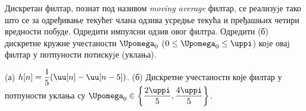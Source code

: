 \PID 
Дискретан филтар, познат под називом \textit{moving average} филтар, се реализуjе тако што се за одређивање текућег
члана одзива усредње текућа и пређашњих четири вредности побуде. Одредити импулсни одзив овог филтра.
Одредити (б) дискретне кружне учестаности $\Upomega_0$ ($0 \leq \Upomega_0 \leq \uppi$) 
коjе оваj филтар у потпуности потискуjе (уклања).

\REZULTAT
(а) $h[n] = \dfrac{1}{5}( \uu[n] - \uu[n-5] )$. (б) Дискретне учестаности које филтар у потпуности уклања су 
$
    \Upomega_0 \in \left\{  \dfrac{2\uppi}{5}, \dfrac{4\uppi}{5} \right\}
$.